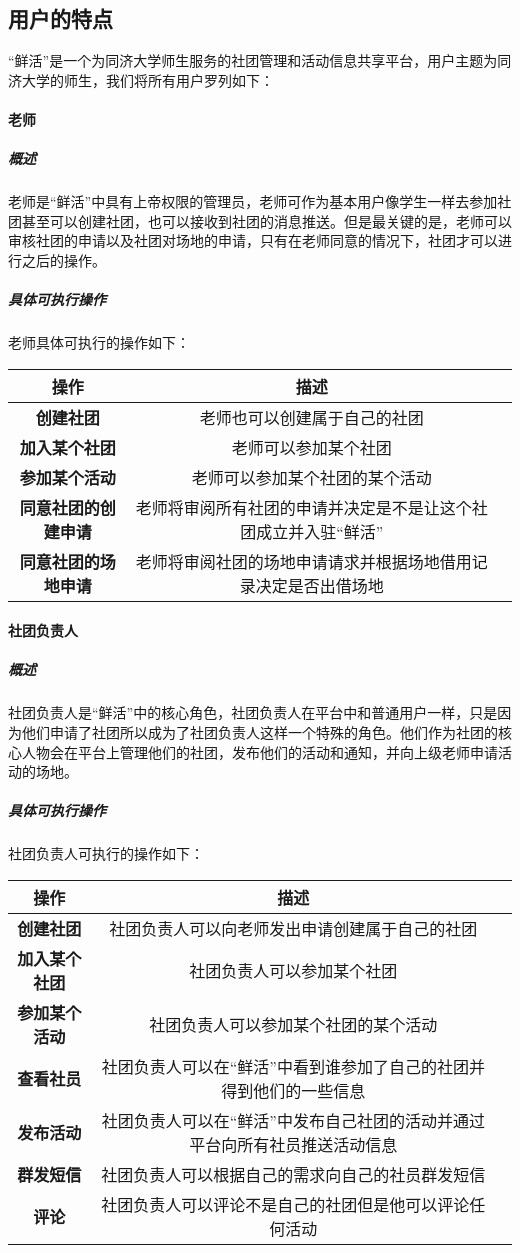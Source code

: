 \documentclass[UTF8]{ctexart}
\begin{document}
\subsection{用户的特点}
“鲜活”是一个为同济大学师生服务的社团管理和活动信息共享平台，用户主题为同济大学的师生，我们将所有用户罗列如下：

\paragraph{老师}
\subparagraph{概述}
老师是“鲜活”中具有上帝权限的管理员，老师可作为基本用户像学生一样去参加社团甚至可以创建社团，也可以接收到社团的消息推送。但是最关键的是，老师可以审核社团的申请以及社团对场地的申请，只有在老师同意的情况下，社团才可以进行之后的操作。
\subparagraph{具体可执行操作}
老师具体可执行的操作如下：
\newline
\newline
\begin{tabular}{ccc}
\toprule
操作& 描述\\
\midrule
\textbf{创建社团}& 老师也可以创建属于自己的社团\\
\textbf{加入某个社团}& 老师可以参加某个社团\\
\textbf{参加某个活动}&老师可以参加某个社团的某个活动\\
\textbf{同意社团的创建申请}&老师将审阅所有社团的申请并决定是不是让这个社团成立并入驻“鲜活”\\
\textbf{同意社团的场地申请}&老师将审阅社团的场地申请请求并根据场地借用记录决定是否出借场地\\
\bottomrule
\end{tabular}

\paragraph{社团负责人}
\subparagraph{概述}
社团负责人是“鲜活”中的核心角色，社团负责人在平台中和普通用户一样，只是因为他们申请了社团所以成为了社团负责人这样一个特殊的角色。他们作为社团的核心人物会在平台上管理他们的社团，发布他们的活动和通知，并向上级老师申请活动的场地。
\subparagraph{具体可执行操作}
社团负责人可执行的操作如下：
\newline
\newline
\begin{tabular}{ccc}
\toprule
操作& 描述\\
\midrule
\textbf{创建社团}& 社团负责人可以向老师发出申请创建属于自己的社团\\
\textbf{加入某个社团}& 社团负责人可以参加某个社团\\
\textbf{参加某个活动}&社团负责人可以参加某个社团的某个活动\\
\textbf{查看社员}&社团负责人可以在“鲜活”中看到谁参加了自己的社团并得到他们的一些信息\\
\textbf{发布活动}&社团负责人可以在“鲜活”中发布自己社团的活动并通过平台向所有社员推送活动信息\\
\textbf{群发短信}& 社团负责人可以根据自己的需求向自己的社员群发短信\\
\textbf{评论}& 社团负责人可以评论不是自己的社团但是他可以评论任何活动\\
\bottomrule
\end{tabular}
\end{document}
